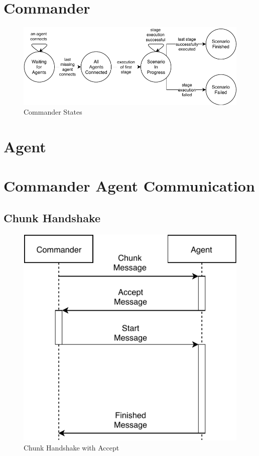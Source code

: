 \section{Commander}
\begin{figure}[h]
	\begin{center}
	\includegraphics[scale=1]{Resources/PDF/CommanderStates}
	\caption{Commander States}
	\label{pic:CommanderStates}
	\end{center}
\end{figure}

\section{Agent}


\section{Commander Agent Communication}
\subsection{Chunk Handshake}
\begin{figure}[h]
	\begin{center}
	\includegraphics[scale=1]{Resources/PDF/ChunkHandshake1}
	\caption{Chunk Handshake with Accept}
	\label{pic:ChunkHandshake1}
	\end{center}
\end{figure}

